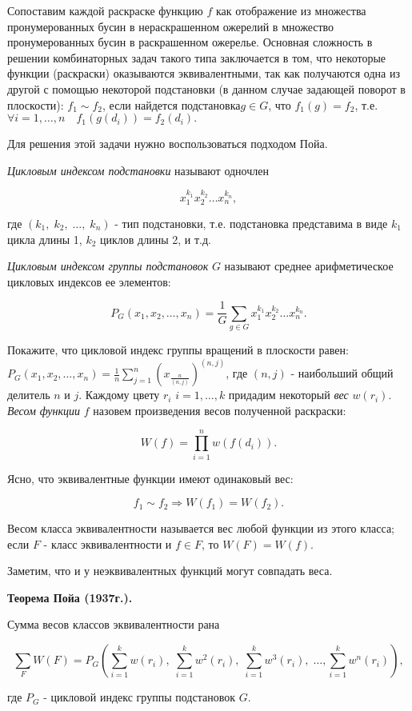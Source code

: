 \begin{ordre}

Сопоставим каждой раскраске функцию $f$ как отображение из множества пронумерованных бусин в нераскрашенном ожерелий в множество пронумерованных бусин в раскрашенном ожерелье. Основная сложность в решении комбинаторных задач такого типа заключается в том, что некоторые функции (раскраски) оказываются эквивалентными, так как получаются одна из другой с помощью некоторой подстановки (в данном случае задающей поворот в плоскости): $f_{1} \sim f_{2} $, если найдется подстановка$g\in G$, что $f_{1} (g)=f_{2} $, т.е. $\forall i=1,\ldots ,n\quad f_{1} \left(g\left(d_{i} \right)\right)=f_{2} \left(d_{i} \right).$

Для решения этой задачи нужно воспользоваться подходом Пойа.

\textit{Цикловым индексом подстановки} называют одночлен

\[x_{1} ^{k_{1} } x_{2} ^{k_{2} } \ldots x_{n} ^{k_{n} } ,\] 

где $\left(k_{1} ,\; k_{2} ,\; \ldots ,\; k_{n} \right)$ - тип подстановки, т.е. подстановка представима в виде $k_{1} $ цикла длины 1, $k_{2} $ циклов длины 2,  и т.д.

\textit{Цикловым индексом группы подстановок} $G$ называют среднее арифметическое цикловых индексов ее элементов:

\[P_{G} (x_{1} ,x_{2} ,\ldots ,x_{n} )=\frac{1}{G} \sum _{g\in G}x_{1} ^{k_{1} } x_{2} ^{k_{2} } \ldots x_{n} ^{k_{n} }  .\] 

Покажите, что цикловой индекс группы вращений в плоскости равен: $P_{G} (x_{1} ,x_{2} ,\ldots ,x_{n} )=\frac{1}{n} \sum _{j=1}^{n}\left(x_{\frac{n}{(n,j)} } \right)^{(n,j)}  $, где $(n,j)$ - наибольший общий делитель $n$ и $j$. Каждому цвету $r_{i} $ $i=1,\ldots ,k$ придадим некоторый \textit{вес} $w(r_{i} )$. \textit{Весом функции} $f$ назовем произведения весов полученной раскраски:

\[W(f)=\prod _{i=1}^{n}w(f(d_{i} )) .\] 

Ясно, что эквивалентные функции имеют одинаковый вес:

\[f_{1} \sim f_{2} \Rightarrow W\left(f_{1} \right)=W\left(f_{2} \right).\] 

Весом класса эквивалентности называется вес любой функции из этого класса; если $F$ - класс эквивалентности и $f\in F$, то $W(F)=W(f)$.

Заметим, что и у неэквивалентных функций могут совпадать веса.

\textbf{Теорема Пойа (1937г.).}

Сумма весов классов эквивалентности рана

\[\sum _{F}W(F) =P_{G} \left(\sum _{i=1}^{k}w(r_{i} ) ,\; \sum _{i=1}^{k}w^{2} (r_{i} ) ,\; \sum _{i=1}^{k}w^{3} (r_{i} ) ,\; \ldots ,\sum _{i=1}^{k}w^{n} (r_{i} ) \right),\] 

где $P_{G} $ - цикловой индекс группы подстановок $G$.

\end{ordre}

